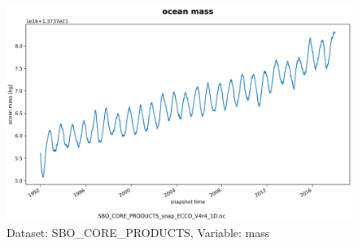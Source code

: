 \begin{figure}[H]
\centering
\includegraphics[scale=0.55]{../images/plots/oneD_plots/SBO_Core_Products/mass.png}
\caption{Dataset: SBO\_CORE\_PRODUCTS, Variable: mass}
\label{tab:table-SBO_CORE_PRODUCTS_mass-Plot}
\end{figure}
\newpage
\pagebreak
